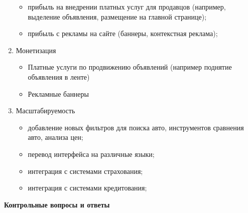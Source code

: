 \begin{enumerate}
\begin{itemize}
            \item прибыль на внедрении платных услуг для продавцов (например, выделение объявления, размещение на главной странице);
            \item прибыль с рекламы на сайте (баннеры, контекстная реклама);
        \end{itemize}
    \item Монетизация
        \begin{itemize}
            \item Платные услуги по продвижению объявлений (например поднятие объявления в ленте)
            \item Рекламные баннеры
        \end{itemize}
    \item Масштабируемость
        
        \begin{itemize}
            \item добавление новых фильтров для поиска авто, инструментов сравнения авто, анализа цен;
            \item перевод интерфейса на различные языки;
            \item интеграция с системами страхования;
            \item интеграция с системами кредитования;
        \end{itemize}
\end{enumerate}

\textbf{Контрольные вопросы и ответы}


